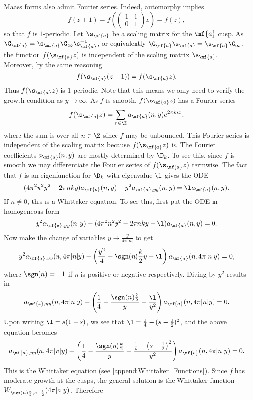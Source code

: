     Maass forms also admit Fourier series. Indeed, automorphy implies
    \[
      f(z+1) = f\left(\begin{pmatrix} 1 & 1 \\ 0 & 1 \end{pmatrix}z\right) = f(z),
    \]
    so that $f$ is $1$-periodic. Let $\s_{\mf{a}}$ be a scaling matrix for the $\mf{a}$ cusp. As $\G_{\mf{a}} = \s_{\mf{a}}\G_{\infty}\s_{\mf{a}}^{-1}$, or equivalently $\G_{\mf{a}}\s_{\mf{a}} = \s_{\mf{a}}\G_{\infty}$, the function $f(\s_{\mf{a}}z)$ is independent of the scaling matrix $\s_{\mf{a}}$. Moreover, by the same reasoning
    \[
      f(\s_{\mf{a}}(z+1)) = f(\s_{\mf{a}}z).
    \]
    Thus $f(\s_{\mf{a}}z)$ is $1$-periodic. Note that this means we only need to verify the growth condition as $y \to \infty$. As $f$ is smooth, $f(\s_{\mf{a}}z)$ has a Fourier series
    \[
      f(\s_{\mf{a}}z) = \sum_{n \in \Z}a_{\mf{a}}(n,y)e^{2\pi inx},
    \]
    where the sum is over all $n \in \Z$ since $f$ may be unbounded. This Fourier series is independent of the scaling matrix because $f(\s_{\mf{a}}z)$ is. The Fourier coefficients $a_{\mf{a}}(n,y)$ are mostly determined by $\D_{k}$. To see this, since $f$ is smooth we may differentiate the Fourier series of $f(\s_{\mf{a}}z)$ termwise. The fact that $f$ is an eigenfunction for $\D_{k}$ with eigenvalue $\l$ gives the ODE
    \[
      (4\pi^{2}n^{2}y^{2}-2\pi nky)a_{\mf{a}}(n,y)-y^{2}a_{\mf{a},yy}(n,y) = \l a_{\mf{a}}(n,y).
    \]
    If $n \neq 0$, this is a Whittaker equation. To see this, first put the ODE in homogeneous form
    \[
      y^{2}a_{\mf{a},yy}(n,y)-(4\pi^{2}n^{2}y^{2}-2\pi nky-\l)a_{\mf{a}}(n,y) = 0.
    \]
    Now make the change of variables $y \to \frac{y}{4\pi|n|}$ to get
    \[
      y^{2}a_{\mf{a},yy}(n,4\pi|n|y)-\left(\frac{y^{2}}{4}-\sgn(n)\frac{k}{2}y-\l\right)a_{\mf{a}}(n,4\pi|n|y) = 0,
    \]
    where $\sgn(n) = \pm1$ if $n$ is positive or negative respectively. Diving by $y^{2}$ results in
    \[
      a_{\mf{a},yy}(n,4\pi|n|y)+\left(\frac{1}{4}-\frac{\sgn(n)\frac{k}{2}}{y}-\frac{\l}{y^{2}}\right)a_{\mf{a}}(n,4\pi|n|y) = 0.
    \]
    Upon writing $\l = s(1-s)$, we see that $\l = \frac{1}{4}-(s-\frac{1}{2})^{2}$, and the above equation becomes
    \[
      a_{\mf{a},yy}(n,4\pi|n|y)+\left(\frac{1}{4}-\frac{\sgn(n)\frac{k}{2}}{y}-\frac{\frac{1}{4}-\left(s-\frac{1}{2}\right)^{2}}{y^{2}}\right)a_{\mf{a}}(n,4\pi|n|y) = 0.
    \]
    This is the Whittaker equation (see \cref{append:Whittaker_Functions}). Since $f$ has moderate growth at the cusps, the general solution is the Whittaker function $W_{\sgn(n)\frac{k}{2},s-\frac{1}{2}}(4\pi|n|y)$. Therefore
